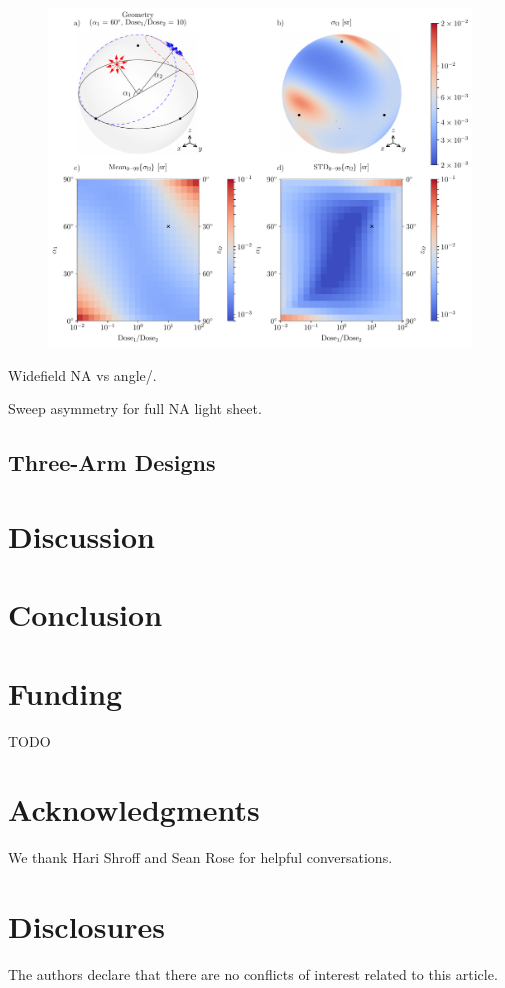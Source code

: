 \documentclass[10pt]{article}
\begin{document}
\begin{figure}[htbp]
\centering\includegraphics[width=\textwidth]{asymmetric-double}
\caption{}
\end{figure}


Widefield NA vs angle/.

Sweep asymmetry for full NA light sheet.



\subsection{Three-Arm Designs}

\section{Discussion}

\section{Conclusion}

\section*{Funding}
TODO

\section*{Acknowledgments}
We thank Hari Shroff and Sean Rose for helpful conversations. 

\section*{Disclosures}
The authors declare that there are no conflicts of interest related to this article.
\end{document}
